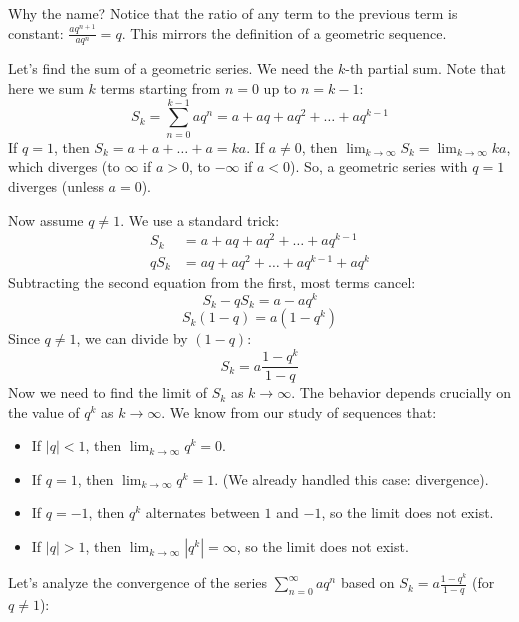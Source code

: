 \documentclass[11pt]{article}
\theoremstyle{definition}
\theoremstyle{remark}
\begin{document}
Why the name? Notice that the ratio of any term to the previous term is constant: $\frac{aq^{n+1}}{aq^n} = q$. This mirrors the definition of a geometric sequence.

Let's find the sum of a geometric series. We need the $k$-th partial sum. Note that here we sum $k$ terms starting from $n=0$ up to $n=k-1$:
\[ S_k = \sum_{n=0}^{k-1} a q^n = a + aq + aq^2 + \dots + aq^{k-1} \]
If $q=1$, then $S_k = a + a + \dots + a = ka$. If $a \neq 0$, then $\lim_{k \to \infty} S_k = \lim_{k \to \infty} ka$, which diverges (to $\infty$ if $a>0$, to $-\infty$ if $a<0$). So, a geometric series with $q=1$ diverges (unless $a=0$).

Now assume $q \neq 1$. We use a standard trick:
\begin{align*} S_k &= a + aq + aq^2 + \dots + aq^{k-1} \\ q S_k &= aq + aq^2 + \dots + aq^{k-1} + aq^k \end{align*}
Subtracting the second equation from the first, most terms cancel:
\[ S_k - q S_k = a - aq^k \]
\[ S_k (1 - q) = a(1 - q^k) \]
Since $q \neq 1$, we can divide by $(1-q)$:
\[ S_k = a \frac{1 - q^k}{1 - q} \]
Now we need to find the limit of $S_k$ as $k \to \infty$. The behavior depends crucially on the value of $q^k$ as $k \to \infty$. We know from our study of sequences that:
\begin{itemize}
    \item If $|q| < 1$, then $\lim_{k \to \infty} q^k = 0$.
    \item If $q = 1$, then $\lim_{k \to \infty} q^k = 1$. (We already handled this case: divergence).
    \item If $q = -1$, then $q^k$ alternates between $1$ and $-1$, so the limit does not exist.
    \item If $|q| > 1$, then $\lim_{k \to \infty} |q^k| = \infty$, so the limit does not exist.
\end{itemize}

Let's analyze the convergence of the series $\sum_{n=0}^{\infty} a q^n$ based on $S_k = a \frac{1 - q^k}{1 - q}$ (for $q \neq 1$):
\end{document}
